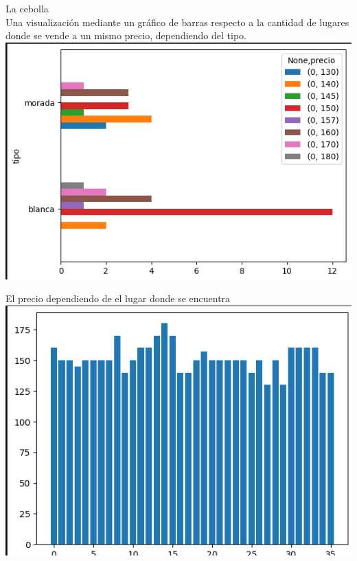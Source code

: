 \documentclass{report}
\begin{document}
    \newpage
    \begin{center}
        {\Huge La cebolla}\\
        \vspace{2cm}
        Una visualización mediante un gráfico de barras respecto a la cantidad de lugares donde se vende a un mismo precio, dependiendo del tipo.\\
        \vspace{1cm}
        \includegraphics[width= 1.0\textwidth]{c-c-p}\\
    \end{center}
    
    \newpage
    \centering
    El precio dependiendo de el lugar donde se encuentra\\
    \vspace{1cm}
    \includegraphics[width= 1.0\textwidth]{barra}\\
\end{document}
